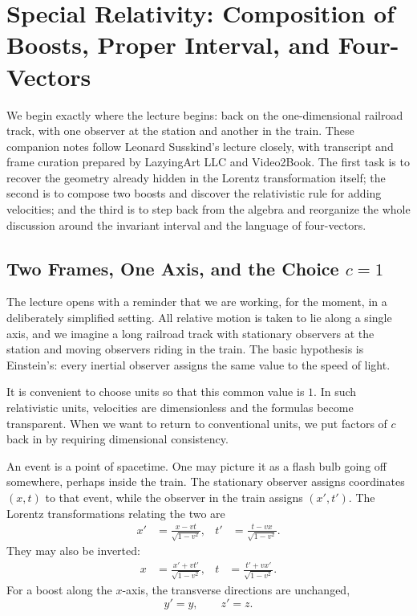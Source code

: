 \chapter{Special Relativity: Composition of Boosts, Proper Interval, and Four-Vectors}

We begin exactly where the lecture begins: back on the one-dimensional railroad track, with one observer at the station and another in the train. These companion notes follow Leonard Susskind's lecture closely, with transcript and frame curation prepared by LazyingArt LLC and Video2Book. The first task is to recover the geometry already hidden in the Lorentz transformation itself; the second is to compose two boosts and discover the relativistic rule for adding velocities; and the third is to step back from the algebra and reorganize the whole discussion around the invariant interval and the language of four-vectors.

\section{Two Frames, One Axis, and the Choice \(c=1\)}

The lecture opens with a reminder that we are working, for the moment, in a deliberately simplified setting. All relative motion is taken to lie along a single axis, and we imagine a long railroad track with stationary observers at the station and moving observers riding in the train. The basic hypothesis is Einstein's: every inertial observer assigns the same value to the speed of light.

It is convenient to choose units so that this common value is \(1\). In such relativistic units, velocities are dimensionless and the formulas become transparent. When we want to return to conventional units, we put factors of \(c\) back in by requiring dimensional consistency.

An event is a point of spacetime. One may picture it as a flash bulb going off somewhere, perhaps inside the train. The stationary observer assigns coordinates \((x,t)\) to that event, while the observer in the train assigns \((x',t')\). The Lorentz transformations relating the two are
\begin{align}
x' &= \frac{x-vt}{\sqrt{1-v^2}}, &
t' &= \frac{t-vx}{\sqrt{1-v^2}}.
\end{align}
They may also be inverted:
\begin{align}
x &= \frac{x'+vt'}{\sqrt{1-v^2}}, &
t &= \frac{t'+vx'}{\sqrt{1-v^2}}.
\end{align}
For a boost along the \(x\)-axis, the transverse directions are unchanged,
\begin{equation}
y'=y,
\qquad
z'=z.
\end{equation}

